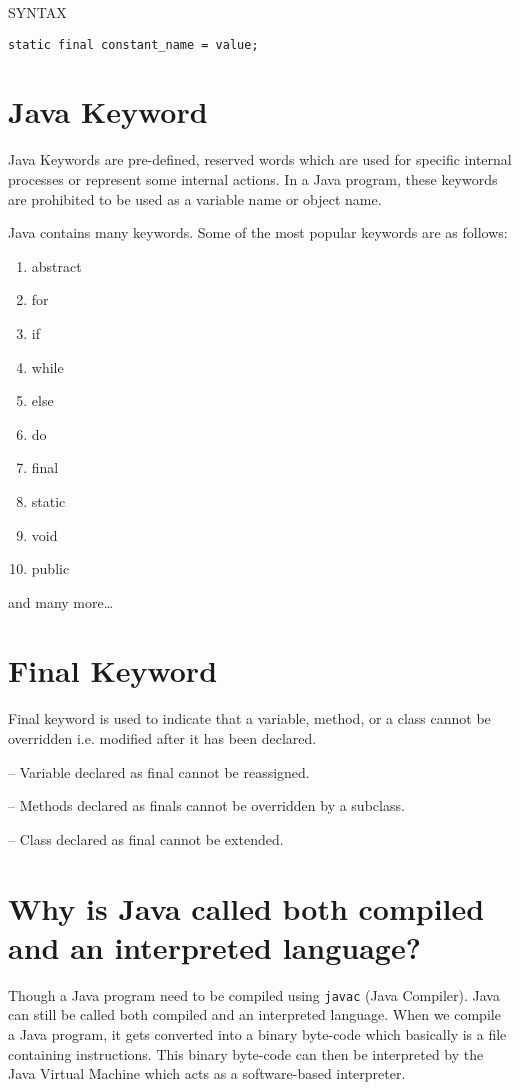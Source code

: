 \documentclass[a4paper, 12pt]{scrarticle}
\begin{document}
SYNTAX

\verb+static final constant_name = value;+


\section{Java Keyword}
Java Keywords are pre-defined, reserved words which are used for specific internal processes or represent some internal actions. In a Java program, these keywords are prohibited to be used as a variable name or object name.

Java contains many keywords. Some of the most popular keywords are as follows:
\begin{enumerate}
  \item abstract
  \item for
  \item if
  \item while
  \item else
  \item do
  \item final
  \item static
  \item void
  \item public
\end{enumerate}

and many more\dots

\section{Final Keyword}
Final keyword is used to indicate that a variable, method, or a class cannot be overridden i.e. modified after it has been declared.

-- Variable declared as final cannot be reassigned.

-- Methods declared as finals cannot be overridden by a subclass.

-- Class declared as final cannot be extended.

\section{Why is Java called both compiled and an interpreted language?}
Though a Java program need to be compiled using \verb+javac+ (Java Compiler). Java can still be called both compiled and an interpreted language. When we compile a Java program, it gets converted into a binary byte-code which basically is a file containing instructions. This binary byte-code can
then be interpreted by the Java Virtual Machine which acts as a software-based interpreter.
\end{document}
